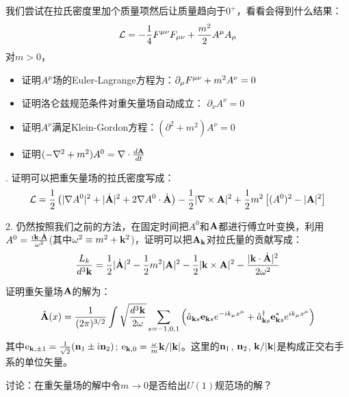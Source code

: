 \documentclass[CJK]{beamer}
\begin{document}
\begin{frame}
\bch
我们尝试在拉氏密度里加个质量项然后让质量趋向于$0^+$，看看会得到什么结果：
$${\mathcal{L}} = -\frac{1}{4}{F^{\mu\nu}}{F_{\mu\nu}} + \frac{m^2}{2} A^\mu A_\mu $$
对$m>0$，
\begin{itemize}
\item{证明$A^\mu$场的Euler-Lagrange方程为：$\partial_\mu {F^{\mu\nu}} + m^2 A^\nu = 0$}
\item{证明洛仑兹规范条件对重矢量场自动成立： $\partial_\nu A^\nu = 0$}
\item{证明$A^\nu$满足Klein-Gordon方程：$(\partial^2 + m^2) A^\nu = 0$}
\item{证明$(-\nabla^2+m^2)A^0 = \nabla \cdot \frac{d{\mathbf{A}}}{dt}$}
\end{itemize}

\ech
\end{frame}

\begin{frame}
. 证明可以把重矢量场的拉氏密度写成：
$${\mathcal{L}} = \frac{1}{2} \left( |\nabla A^0|^2  + |\dot{{\mathbf{A}}}|^2 + 2 \nabla A^0 \cdot \dot{{\mathbf{A}}} \right) - \frac{1}{2}|\nabla \times {\mathbf{A}}|^2 + \frac{1}{2}m^2 \left[(A^0)^2 - |{\mathbf{A}}|^2\right]$$ 

2. 仍然按照我们之前的方法，在固定时间把$A^0$和${\mathbf{A}}$都进行傅立叶变换，利用$A^0 = \frac{i{\mathbf{k}} \cdot\dot {{\mathbf{A}}}}{\omega^2}$(其中$\omega^2 \equiv m^2 + {\mathbf{k}}^2$)，证明可以把${\mathbf{A}}_{\mathbf{k}}$对拉氏量的贡献写成：
$$\frac{L_k}{d^3{\mathbf{k}}} = \frac{1}{2}|\dot{{\mathbf{A}}}|^2 - \frac{1}{2}m^2|{\mathbf{A}}|^2- \frac{1}{2}|{\mathbf{k}}\times{\mathbf{A}}|^2 - \frac{|{\mathbf{k}}\cdot\dot{{\mathbf{A}}}|^2}{2\omega^2}$$

\ech
\end{frame}

\begin{frame}
\bch
证明重矢量场${\mathbf{A}}$的解为：
$$\hat{{\mathbf{A}}}(x) = \frac{1}{(2\pi)^{3/2}} \int \sqrt{\frac{d^3{\mathbf{k}}}{2\omega}} \sum_{s=-1,0,1}\left({\hat{a}}_{{\mathbf{k}} s} \mathbf{e}_{{\mathbf{k}} s} e^{-ik_\mu x^\mu} + {\hat{a}^\dagger}_{{\mathbf{k}} s} \mathbf{e}_{{\mathbf{k}} s}^* e^{ik_\mu x^\mu}\right) $$
其中$\mathrm{e}_{{\mathbf{k}},\pm 1} = \frac{1}{\sqrt{2}}({\mathbf{n}}_1 \pm {\dot{\imath}} {\mathbf{n}}_2)$; $\mathrm{e}_{{\mathbf{k}}, 0} = \frac{\omega}{m} {\mathbf{k}}/|{\mathbf{k}}|$。这里的${\mathbf{n}}_1$, ${\mathbf{n}}_2$, ${\mathbf{k}}/|{\mathbf{k}}|$是构成正交右手系的单位矢量。 

\skipline

讨论：在重矢量场的解中令$m\rightarrow 0$是否给出$U(1)$规范场的解？
\ech
\end{frame}
\end{document}
